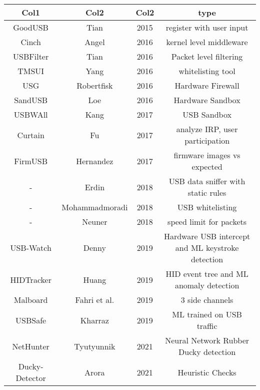 \begin{center}
\begin{tabular}{|c c c c|} 
 \hline
 Col1 & Col2 & Col2 & type \\ [0.5ex] 
 \hline\hline
 GoodUSB & Tian \cite{tianDefendingMaliciousUSB2015} & 2015 & register with user input \\
 \hline
 Cinch & Angel \cite{angelDefendingMaliciousPeripherals2016} & 2016 & kernel level middleware \\
 \hline
 USBFilter & Tian \cite{tianMakingUSBGreat2016} & 2016 & Packet level filtering \\
 \hline
 TMSUI & Yang \cite{yangTMSUITrustManagement2016} & 2016 & whitelisting tool \\
 \hline
 USG & Robertfisk \cite{robertfiskRobertfiskUSG2016}  & 2016 & Hardware Firewall\\
 \hline
 SandUSB \cite{loeSandUSBInstallationfreeSandbox2016} & Loe & 2016 & Hardware Sandbox \\
 \hline
 USBWAll & Kang \cite{kangUSBWallNovelSecurity2017} & 2017 & USB Sandbox \\
 \hline
 Curtain &  Fu \cite{fuCurtainKeepYour2017} & 2017 & analyze IRP, user participation\\
 \hline
 FirmUSB & Hernandez \cite{hernandezFirmUSBVettingUSB2017} & 2017 & firmware images vs expected\\
 \hline
 - & Erdin \cite{erdinOSIndependentHardwareAssisted2018} & 2018 & USB data sniffer with static rules \\
 \hline
 -  & Mohammadmoradi \cite{mohammadmoradiMakingWhitelistingBasedDefense2018}  & 2018 & USB whitelisting\\
 \hline
 - & Neuner \cite{neunerUSBlockBlockingUSBBased2018} & 2018 & speed limit for packets \\
 \hline
 USB-Watch & Denny \cite{denneyUSBWatchDynamicHardwareAssisted2019} & 2019 & Hardware USB intercept and ML keystroke detection \\
 \hline
 HIDTracker & Huang \cite{IdentifyingHIDbasedAttacks2019} & 2019 & HID event tree and ML anomaly detection \\
 \hline
 Malboard & Fahri et al. \cite{farhiMalboardNovelUser2019} & 2019 & 3 side channels \\
 \hline
 USBSafe & Kharraz \cite{kharrazUSBESAFEEndPointSolution2019} & 2019 & ML trained on USB traffic\\
 \hline
 NetHunter & Tyutyunnik \cite{IntelligentSystemPreventing} & 2021 & Neural Network Rubber Ducky detection \\
 \hline
 Ducky-Detector & Arora \cite{USBRubberDucky2021} & 2021 & Heuristic Checks \\
 \hline
 
\end{tabular}
\end{center}

